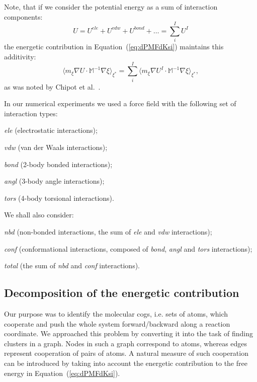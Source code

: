 \documentclass[a4paper,11pt,twoside]{book}%
\begin{document}
Note, that if we consider the potential energy as a sum of interaction components:
\begin{equation}
\nonumber U = U^{ele}+U^{vdw}+U^{bond}+\ldots =  \sum_{i}^I U^I 
\end{equation}
the  energetic contribution in Equation~(\ref{eq:dPMFdKsi}) maintains this additivity:
\begin{equation}
\langle m_\xi  \nabla U\cdot \mathbb{M}^{-1} \nabla\xi\rangle_{\xi^*} =  \sum_i^{I} \langle m_\xi \nabla U^I\cdot \mathbb{M}^{-1}\nabla\xi\rangle_{\xi^*} ,
\end{equation}
as was noted by Chipot et al.~\cite{chipot2007free}.

In our numerical experiments we used a force field with the following set of interaction types:
\begin{packeditemize}
 \item \emph{ele} (electrostatic interactions);
 \item \emph{vdw} (van der Waals interactions);
 \item \emph{bond} (2-body bonded interactions);
 \item \emph{angl} (3-body angle interactions);
 \item \emph{tors} (4-body torsional interactions).
\end{packeditemize}
We shall also consider:
\begin{packeditemize} 
 \item \emph{nbd} (non-bonded interactions, the sum of \emph{ele} and \emph{vdw} interactions);
 \item \emph{conf} (conformational interactions, composed of \emph{bond}, \emph{angl} and \emph{tors} interactions);
 \item \emph{total} (the sum of \emph{nbd} and \emph{conf} interactions).
\end{packeditemize}

\subsection{Decomposition of the energetic contribution}\label{sec:decomposition}
Our purpose was to identify the molecular cogs{\color{black}, i.e.} sets of atoms, which cooperate and push the whole system forward/backward along a reaction coordinate.
We approached this problem by converting it {\color{black}in}to the task of finding clusters in a graph.
Nodes in such a graph correspond to atoms, whereas edges represent cooperation of pairs of atoms.
A natural measure of such cooperation can be introduced by taking into account the energetic contribution to the free energy in Equation~(\ref{eq:dPMFdKsi}).
\end{document}
